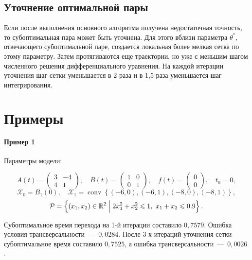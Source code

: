 \documentclass[12pt, a4paper]{article} %
\renewcommand{\le}{\leqslant}
\newcommand{\Real}{\mathbb{R}}
\DeclareMathOperator{\conv}{conv}
\begin{document}
\subsection{Уточнение оптимальной пары}

Если после выполнения основного алгоритма получена недостаточная точность,
то субоптимальная пара может быть уточнена.
Для этого вблизи параметра $\theta^{*}$, отвечающего субоптимальной паре,
создается локальная более мелкая сетка по этому параметру.
Затем протягиваются еще траектории, но уже с меньшим шагом численного 
решения дифференциального уравнения.
На каждой итерации уточнения шаг сетки уменьшается в 2 раза и в 1,5 раза 
уменьшается шаг интегрирования.

\section{Примеры}
\paragraph{Пример 1}

Параметры модели:

\[
    A(t) = 
    \left(\begin{array}{cc}
            3 & -4 \\
            4 & 1
    \end{array}\right), \quad 
    B(t) = \left(
    \begin{array}{cc}
        1 & 0 \\
        0 & 1
    \end{array} \right), \quad 
    f(t) = \left( 
        \begin{array}{cc}
        0 \\ 0
    \end{array} 
    \right), \quad t_0 = 0,
\]
\[
    \mathcal{X}_0 = B_1(0), \quad
    \mathcal{X}_1 = \conv \left\{ 
        (-6, 0), (-6, 1), (-8, 0), (-8, 1)
    \right\}
,\] 
\[
    \mathcal{P} = \left\{ (x_1, x_2) \in \Real^2 \Bigm| 
    2x_1^2 + x_2^2 \le 1,\
    x_1 + x_2 \le 0.9\right\}
.\] 

Субоптимальное время перехода на 1-й итерации составило $0{,}7579$.
Ошибка условия трансверсальности~---~$0{,}0284$.
После 3-х итераций уточнения сетки субоптимальное время составило 
$0{,}7525$, а ошибка трансверсальности~---~$0{,}0026$.
\end{document}
